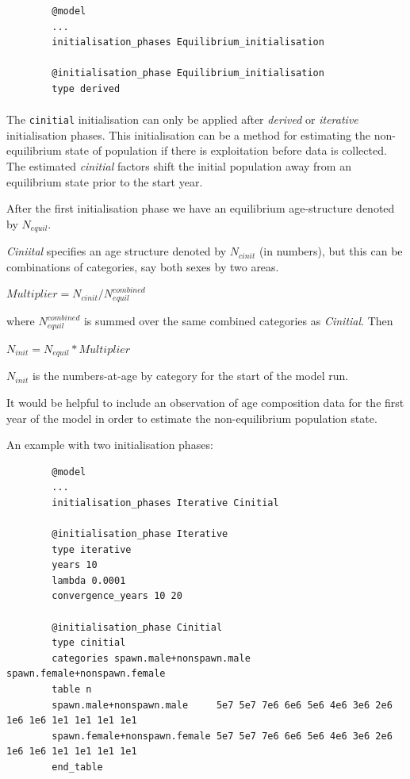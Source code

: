 {\small{\begin{verbatim}
		@model
		...
		initialisation_phases Equilibrium_initialisation

		@initialisation_phase Equilibrium_initialisation
		type derived
		\end{verbatim}}}

\paragraph{}

The \texttt{cinitial} initialisation can only be applied after \textit{derived} or \textit{iterative} initialisation phases. This initialisation can be a method for estimating the non-equilibrium state of population if there is exploitation before data is collected. The estimated \textit{cinitial} factors shift the initial population away from an equilibrium state prior to the start year.

After the first initialisation phase we have an equilibrium age-structure denoted by $N_{equil}$.

\textit{Ciniital} specifies an age structure denoted by $N_{cinit}$ (in numbers), but this can be combinations of categories, say both sexes by two areas.

$Multiplier =  N_{cinit} / N_{equil}^{combined}$

where $N_{equil}^{combined} $ is summed over the same combined categories as \textit{Cinitial}. Then

$N_{init} =  N_{equil} * Multiplier $

$N_{init}$ is the numbers-at-age by category for the start of the model run.

It would be helpful to include an observation of age composition data for the first year of the model in order to estimate the non-equilibrium population state.

An example with two initialisation phases:

{\small{\begin{verbatim}
		@model
		...
		initialisation_phases Iterative Cinitial

		@initialisation_phase Iterative
		type iterative
		years 10
		lambda 0.0001
		convergence_years 10 20

		@initialisation_phase Cinitial
		type cinitial
		categories spawn.male+nonspawn.male spawn.female+nonspawn.female
		table n
		spawn.male+nonspawn.male     5e7 5e7 7e6 6e6 5e6 4e6 3e6 2e6 1e6 1e6 1e1 1e1 1e1 1e1
		spawn.female+nonspawn.female 5e7 5e7 7e6 6e6 5e6 4e6 3e6 2e6 1e6 1e6 1e1 1e1 1e1 1e1
		end_table
		\end{verbatim}}}

